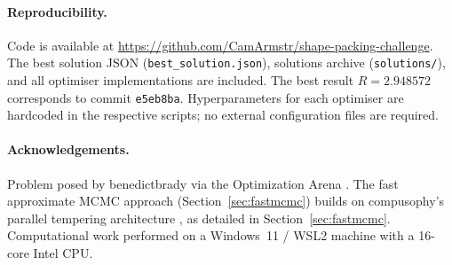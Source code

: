 \documentclass[11pt]{article}
\begin{document}
\paragraph{Reproducibility.}
Code is available at \url{https://github.com/CamArmstr/shape-packing-challenge}.
The best solution JSON (\texttt{best\_solution.json}), solutions archive (\texttt{solutions/}), and all optimiser implementations are included.
The best result $R = 2.948572$ corresponds to commit \texttt{e5eb8ba}.
Hyperparameters for each optimiser are hardcoded in the respective scripts; no external configuration files are required.

\paragraph{Acknowledgements.}
Problem posed by benedictbrady via the Optimization Arena \citep{optimizationarena2026}.
The fast approximate MCMC approach (Section~\ref{sec:fastmcmc}) builds on compusophy's parallel tempering architecture \citep{compusophy2026}, as detailed in Section~\ref{sec:fastmcmc}.
Computational work performed on a Windows~11 / WSL2 machine with a 16-core Intel CPU.



\end{document}
